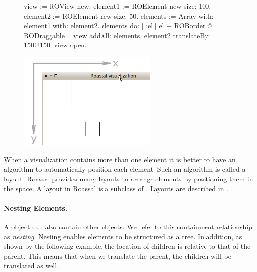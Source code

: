 \documentclass[a4paper,10pt,twoside]{book}
\begin{document}
\begin{figure}[H]
      \begin{minipage}[t]{0.5\textwidth}
      \vspace{0pt}
\begin{code}{}
view := ROView new.
element1 := ROElement new size: 100.
element2 := ROElement new size: 50.
elements := Array with: element1 with: element2.
elements do: [ :el | el + ROBorder @ RODraggable ].
view addAll: elements.
element2 translateBy: 150@150.
view open.
\end{code}
   \end{minipage}
   \hfill
   \begin{minipage}[t]{0.6\textwidth}
      \vspace{0pt} \raggedright
       \centering
		\includegraphics[width=0.6\textwidth]{ex4}
   \end{minipage}
\label{fig:ex4}
\end{figure}


When a visualization contains more than one element it is better to have an algorithm to automatically position each element. Such an algorithm is called a layout. Roassal provides many layouts to arrange elements by positioning them in the space. A layout in Roassal is a subclass of . Layouts are described in .

\paragraph{Nesting Elements.}
A  object can also contain other  objects. We refer to this containment relationship as \emph{nesting}. Nesting enables elements to be structured as a tree. In addition, as shown by the following example, the location of children is relative to that of the parent. This means that when we translate the parent, the children will be translated as well. %
\end{document}
